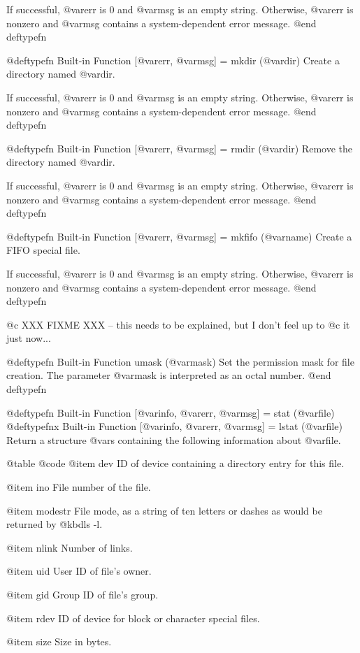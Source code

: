 {{If successful, @var{err} is 0 and @var{msg} is an empty string.
Otherwise, @var{err} is nonzero and @var{msg} contains a
system-dependent error message.
@end deftypefn

@deftypefn {Built-in Function} {[@var{err}, @var{msg}] =} mkdir (@var{dir})
Create a directory named @var{dir}.

If successful, @var{err} is 0 and @var{msg} is an empty string.
Otherwise, @var{err} is nonzero and @var{msg} contains a
system-dependent error message.
@end deftypefn

@deftypefn {Built-in Function} {[@var{err}, @var{msg}] =} rmdir (@var{dir})
Remove the directory named @var{dir}.

If successful, @var{err} is 0 and @var{msg} is an empty string.
Otherwise, @var{err} is nonzero and @var{msg} contains a
system-dependent error message.
@end deftypefn

@deftypefn {Built-in Function} {[@var{err}, @var{msg}] =} mkfifo (@var{name})
Create a FIFO special file.

If successful, @var{err} is 0 and @var{msg} is an empty string.
Otherwise, @var{err} is nonzero and @var{msg} contains a
system-dependent error message.
@end deftypefn

@c XXX FIXME XXX -- this needs to be explained, but I don't feel up to
@c it just now...

@deftypefn {Built-in Function} {} umask (@var{mask})
Set the permission mask for file creation.  The parameter @var{mask} is
interpreted as an octal number.
@end deftypefn

@deftypefn {Built-in Function} {[@var{info}, @var{err}, @var{msg}] =} stat (@var{file})
@deftypefnx {Built-in Function} {[@var{info}, @var{err}, @var{msg}] =} lstat (@var{file})
Return a structure @var{s} containing the following information about
@var{file}.

@table @code
@item dev
ID of device containing a directory entry for this file.

@item ino
File number of the file.

@item modestr
File mode, as a string of ten letters or dashes as would be returned by
@kbd{ls -l}.

@item nlink
Number of links.

@item uid
User ID of file's owner.

@item gid
Group ID of file's group.

@item rdev
ID of device for block or character special files.

@item size
Size in bytes.

}}
